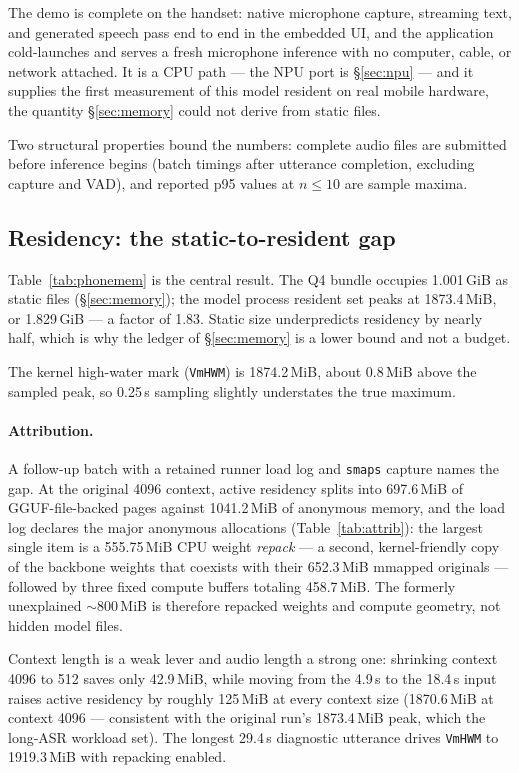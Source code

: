 \documentclass[10pt,twocolumn,letterpaper]{article}
\begin{document}
The demo is complete on the handset: native microphone capture, streaming
text, and generated speech pass end to end in the embedded UI, and the
application cold-launches and serves a fresh microphone inference with no
computer, cable, or network attached. It is a CPU path --- the NPU port is
\S\ref{sec:npu} --- and it supplies the first measurement of this model
resident on real mobile hardware, the quantity \S\ref{sec:memory} could not
derive from static files.

Two structural properties bound the numbers: complete audio files are
submitted before inference begins (batch timings after utterance completion,
excluding capture and VAD), and reported p95 values at $n \leq 10$ are sample
maxima.

\subsection{Residency: the static-to-resident gap}

Table~\ref{tab:phonemem} is the central result. The Q4 bundle occupies
1.001\,GiB as static files (\S\ref{sec:memory}); the model process resident
set peaks at 1873.4\,MiB, or 1.829\,GiB --- a factor of 1.83. Static size
underpredicts residency by nearly half, which is why the ledger of
\S\ref{sec:memory} is a lower bound and not a budget.

The kernel high-water mark (\texttt{VmHWM}) is 1874.2\,MiB, about 0.8\,MiB
above the sampled peak, so 0.25\,s sampling slightly understates the true
maximum.

\paragraph{Attribution.}
A follow-up batch with a retained runner load log and \texttt{smaps} capture
names the gap. At the original 4096 context, active residency splits into
697.6\,MiB of GGUF-file-backed pages against 1041.2\,MiB of anonymous memory,
and the load log declares the major anonymous allocations
(Table~\ref{tab:attrib}): the largest single item is a 555.75\,MiB CPU weight
\emph{repack} --- a second, kernel-friendly copy of the backbone weights that
coexists with their 652.3\,MiB mmapped originals --- followed by three fixed
compute buffers totaling 458.7\,MiB. The formerly unexplained $\sim$800\,MiB
is therefore repacked weights and compute geometry, not hidden model files.

Context length is a weak lever and audio length a strong one: shrinking
context 4096 to 512 saves only 42.9\,MiB, while moving from the 4.9\,s to the
18.4\,s input raises active residency by roughly 125\,MiB at every context
size (1870.6\,MiB at context 4096 --- consistent with the original run's
1873.4\,MiB peak, which the long-ASR workload set). The longest 29.4\,s
diagnostic utterance drives \texttt{VmHWM} to 1919.3\,MiB with repacking
enabled.
\end{document}
